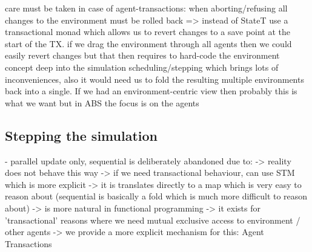 care must be taken in case of agent-transactions: when aborting/refusing all changes to the environment must be rolled back => instead of StateT use a transactional monad which allows us to revert changes to a save point at the start of the TX. if we drag the environment through all agents then we could easily revert changes but that then requires to hard-code the environment concept deep into the simulation scheduling/stepping which brings lots of inconveniences, also it would need us to fold the resulting multiple environments back into a single. If we had an environment-centric view then probably this is what we want but in ABS the focus is on the agents

\subsection{Stepping the simulation}

- parallel update only, sequential is deliberately abandoned due to:
		-> reality does not behave this way
		-> if we need transactional behaviour, can use STM which is more explicit
		-> it is translates directly to a map which is very easy to reason about (sequential is basically a fold which is much more difficult to reason about)
		-> is more natural in functional programming
		-> it exists for 'transactional' reasons where we need mutual exclusive access to environment / other agents
			-> we provide a more explicit mechanism for this: Agent Transactions
			